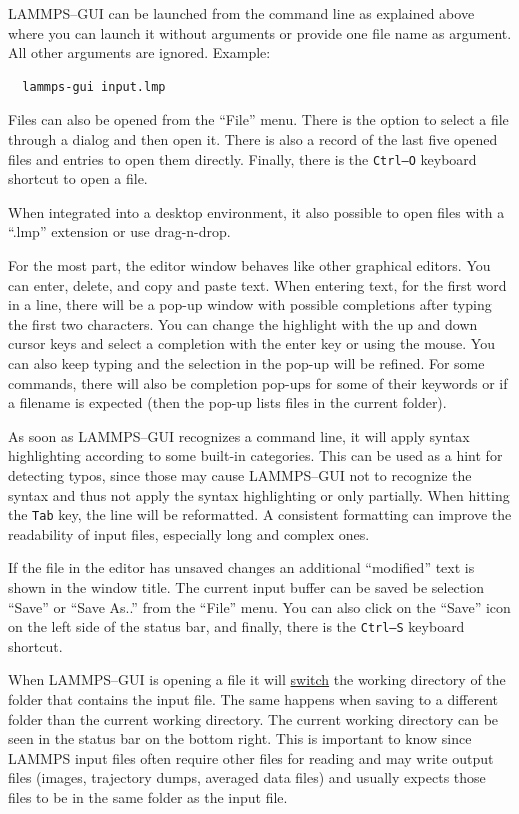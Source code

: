 \documentclass[9pt,tutorial]{livecoms}
\renewcommand{\emph}[1]{\underline{#1}} %
\begin{document}
\begin{appendices}
LAMMPS--GUI can be launched from the command line as explained above where you
can launch it without arguments or provide one file name as argument.  All
other arguments are ignored. Example:
{
\normalsize
\begin{verbatim}
  lammps-gui input.lmp
\end{verbatim}
}
Files can also be opened from the ``File'' menu.  There is the option
to select a file through a dialog and then open it.  There is also a
record of the last five opened files and entries to open them directly.
Finally, there is the \texttt{Ctrl--O} keyboard shortcut to open a file.

When integrated into a desktop environment, it also possible to open
files with a ``.lmp'' extension or use drag-n-drop.

For the most part, the editor window behaves like other graphical
editors.  You can enter, delete, and copy and paste text.  When entering
text, for the first word in a line, there will be a pop-up window with
possible completions after typing the first two characters. You can
change the highlight with the up and down cursor keys and select a
completion with the enter key or using the mouse.  You can also keep
typing and the selection in the pop-up will be refined.  For some
commands, there will also be completion pop-ups for some of their
keywords or if a filename is expected (then the pop-up lists files in
the current folder).

As soon as LAMMPS--GUI recognizes a command line, it will apply syntax
highlighting according to some built-in categories.  This can be used as
a hint for detecting typos, since those may cause LAMMPS--GUI not to
recognize the syntax and thus not apply the syntax highlighting or only
partially.  When hitting the \texttt{Tab} key, the line will be
reformatted.  A consistent formatting can improve the readability of
input files, especially long and complex ones.

If the file in the editor has unsaved changes an additional
``\*modified\*'' text is shown in the window title.  The current input
buffer can be saved be selection ``Save'' or ``Save As..'' from the
``File'' menu.  You can also click on the ``Save'' icon on the left side
of the status bar, and finally, there is the \texttt{Ctrl--S} keyboard
shortcut.


\begin{note}
When LAMMPS--GUI is opening a file it will \emph{switch} the working directory
of the folder that contains the input file.  The same happens when saving to
a different folder than the current working directory.  The current working
directory can be seen in the status bar on the bottom right.  This is important
to know since LAMMPS input files often require other files for reading and may
write output files (images, trajectory dumps, averaged data files) and usually
expects those files to be in the same folder as the input file.
\end{note}


\end{appendices}
\end{document}

